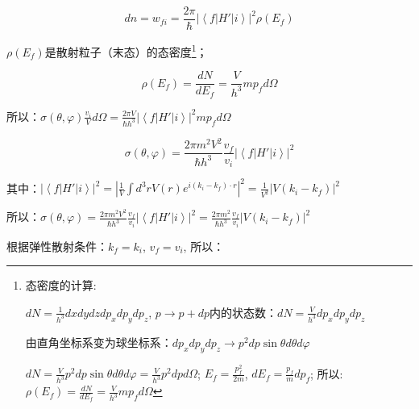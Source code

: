 \begin{equation}\label{27-2}
dn = w_{fi}  = \frac{{2\pi }}{\hbar }\left| {\left\langle {f\left| {H'} \right|\left. i \right\rangle } \right.} \right|^2 \rho \left( {E_f } \right)
\end{equation}


$\rho \left( {E_f } \right)$是散射粒子（末态）的态密度\footnote{态密度的计算:

$dN = \frac{1}{{h^3 }}dxdydzdp_x dp_y dp_z $, $p \to p + dp$内的状态数：$dN = \frac{V}{{h^3 }}dp_x dp_y dp_z $

由直角坐标系变为球坐标系：$dp_x dp_y dp_z  \to p^2 dp\sin \theta d\theta d\varphi $

$dN = \frac{V}{{h^3 }}p^2 dp\sin \theta d\theta d\varphi =
\frac{V}{{h^3 }}p^2 dpd\Omega $; $E_f  = \frac{{p_f^2 }}{{2m}}$,
$dE_f  = \frac{{p_f }}{m}dp_f $; 所以: $\rho \left( {E_f } \right) =
\frac{{dN}}{{dE_f }} = \frac{V}{{h^3 }}mp_f d\Omega $}；

\begin{equation}\label{27-3}
\rho \left( {E_f } \right) = \frac{{dN}}{{dE_f }} = \frac{V}{{h^3 }}mp_f d\Omega
\end{equation}


所以：$\sigma \left( {\theta ,\varphi } \right)\frac{{v_i }}{V}d\Omega  = \frac{{2\pi V}}{{\hbar h^3 }}\left| {\left\langle {f\left| {H'} \right|\left. i \right\rangle } \right.} \right|^2 mp_f d\Omega $


\begin{equation}\label{27-4}
\sigma \left( {\theta ,\varphi } \right) = \frac{{2\pi m^2 V^2 }}{{\hbar h^3 }}\frac{{v_f }}{{v_i }}\left| {\left\langle {f\left| {H'} \right|\left. i \right\rangle } \right.} \right|^2
\end{equation}


其中：$\left| {\left\langle {f\left| {H'} \right|\left. i \right\rangle } \right.} \right|^2  = \left| {\frac{1}{V}\int {d^3 rV(r)e^{i\left( {k_i  - k_f } \right) \cdot r} } } \right|^2  = \frac{1}{{V^2 }}\left| {V(k_i  - k_f )} \right|^2 $

所以：$\sigma \left( {\theta ,\varphi } \right) = \frac{{2\pi m^2 V^2 }}{{\hbar h^3 }}\frac{{v_f }}{{v_i }}\left| {\left\langle {f\left| {H'} \right|\left. i \right\rangle } \right.} \right|^2  = \frac{{2\pi m^2 }}{{\hbar h^3 }}\frac{{v_f }}{{v_i }}\left| {V(k_i  - k_f )} \right|^2 $


根据弹性散射条件：$k_f = k_i$, $v_f = v_i$, 所以：


